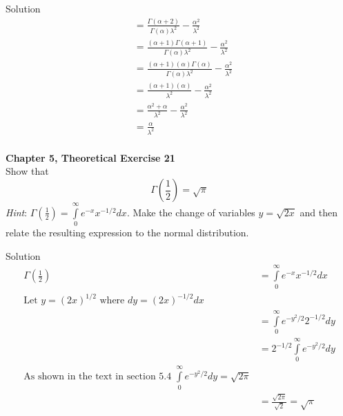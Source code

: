 \documentclass{article}
\begin{document}
\begin{spacing}{1.1}
\begin{homeworkProblem}
\begin{homeworkSection}{Solution}
\begin{align*}
      &= \frac{ \Gamma( \alpha + 2)}{ \Gamma( \alpha) \lambda^2} - \frac{ \alpha^2}{ \lambda^2}\\
      &= \frac{ (\alpha + 1)\Gamma( \alpha + 1)}{ \Gamma( \alpha) \lambda^2} - \frac{ \alpha^2}{ \lambda^2}\\
      &= \frac{ (\alpha + 1)(\alpha)\Gamma( \alpha)}{ \Gamma( \alpha) \lambda^2} - \frac{ \alpha^2}{ \lambda^2}\\
      &= \frac{ (\alpha + 1)(\alpha)}{ \lambda^2} - \frac{ \alpha^2}{ \lambda^2}\\
      &= \frac{ \alpha^2 + \alpha}{ \lambda^2} - \frac{ \alpha^2}{ \lambda^2}\\
      &= \frac{\alpha}{ \lambda^2}\\
    \end{align*}
  \end{homeworkSection}
\end{homeworkProblem}

\newpage
\begin{homeworkProblem}
  {\bf Chapter 5, Theoretical Exercise 21}\\
  Show that 
  \[\Gamma \left(\frac{ 1}{ 2}\right) = \sqrt{ \pi}\]
  \emph{Hint}: $\Gamma\left( \frac{ 1}{ 2}\right) = \int\limits_0^{\infty} e^{-x} x^{-1/2} dx$. 
  Make the change of variables $y = \sqrt{ 2x}$ and then relate the resulting expression
  to the normal distribution.
  \begin{homeworkSection}{Solution}
    \begin{align*}
      \Gamma\left( \frac{ 1}{ 2}\right) &= \int\limits_0^{\infty} e^{-x} x^{-1/2} dx\\
      \text{Let $y =  (2x)^{1/2}$ where $dy = (2x)^{-1/2} dx$}\\
      &= \int\limits_0^{\infty} e^{-y^2/2} 2^{-1/2} dy\\
      &= 2^{-1/2} \int\limits_0^{\infty} e^{-y^2/2} dy\\
      \text{As shown in the text in section 5.4 
        $\int\limits_0^{\infty} e^{-y^2/2} dy = \sqrt{2 \pi}$}\\
      &= \frac{ \sqrt{ 2 \pi}}{ \sqrt{ 2}} = \sqrt{ \pi}
    \end{align*}
  \end{homeworkSection}
\end{homeworkProblem}


\end{spacing}
\end{document}
